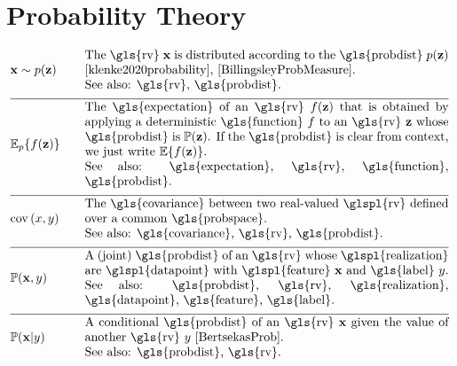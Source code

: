 \newpage
\section*{Probability Theory} 
\begin{align}
	&\featurevec \sim p(\vz)  &\quad & \parbox{.85\textwidth}{The \gls{rv} $\featurevec$ is distributed according to 
		the \gls{probdist} $p(\vz)$ \cite{klenke2020probability}, \cite{BillingsleyProbMeasure}.
		\\ See also: \gls{rv}, \gls{probdist}.}  \nonumber \\[2mm] \hline \nonumber\\[-5mm]  
	&\expect_{p} \{ f(\datapoint) \}  &\quad & \parbox{.85\textwidth}{The \gls{expectation} of an \gls{rv} $f(\datapoint)$ that 
		is obtained by applying a deterministic \gls{function} $f$ to an \gls{rv}
		$\datapoint$ whose \gls{probdist} is $\prob{\datapoint}$. If the \gls{probdist} is clear from context, 
		we just write $\expect \{ f(\datapoint) \}$. 
		\\ See also: \gls{expectation}, \gls{rv}, \gls{function}, \gls{probdist}.}  \nonumber \\[2mm] \hline \nonumber\\[-5mm]
	&\cov{x}{y} &\quad & \parbox{.85\textwidth}{The \gls{covariance} between two real-valued \glspl{rv} defined 
		over a common \gls{probspace}. 
		\\ See also: \gls{covariance}, \gls{rv}, \gls{probdist}.}  \nonumber \\[2mm] \hline \nonumber\\[-5mm]
	&\prob{\featurevec,\truelabel} &\quad & \parbox{.85\textwidth}{A (joint) \gls{probdist} of an \gls{rv} 
		whose \glspl{realization} are \glspl{datapoint} with \glspl{feature} $\featurevec$ and \gls{label} $\truelabel$.
		\\ See also: \gls{probdist}, \gls{rv}, \gls{realization}, \gls{datapoint}, \gls{feature}, 
		\gls{label}.} \nonumber \\[2mm] \hline \nonumber\\[-5mm]
	&\prob{\featurevec|\truelabel} &\quad & \parbox{.85\textwidth}{A conditional \gls{probdist} of an \gls{rv} 
		$\featurevec$ given the value of another \gls{rv} $\truelabel$ \cite[Sec.\ 3.5]{BertsekasProb}. 
		\\ See also: \gls{probdist}, \gls{rv}. } \nonumber 
\end{align} 
\newpage
